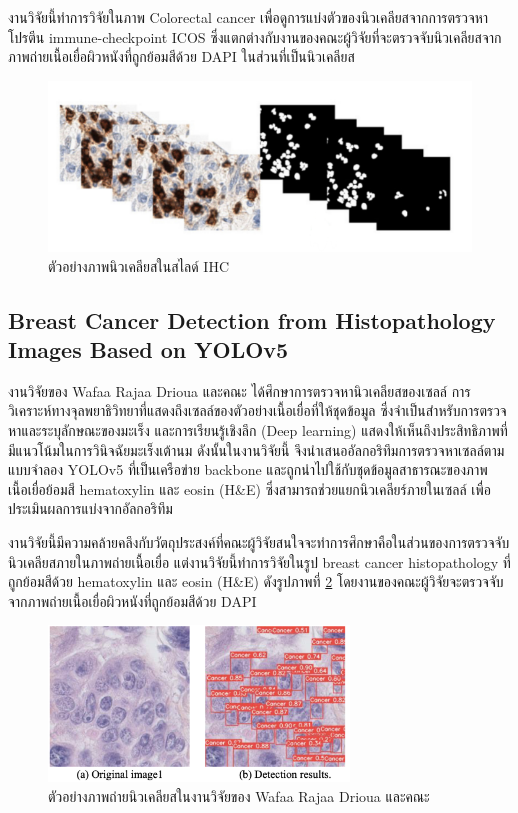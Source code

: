 \documentclass[12pt,oneside,openright,a4paper]{cpe-thai-project}
\begin{document}
 งานวิจัยนี้ทำการวิจัยในภาพ Colorectal cancer เพื่อดูการแบ่งตัวของนิวเคลียสจากการตรวจหาโปรตีน immune-checkpoint ICOS ซึ่งแตกต่างกับงานของคณะผู้วิจัยที่จะตรวจจับนิวเคลียสจากภาพถ่ายเนื้อเยื่อผิวหนังที่ถูกย้อมสีด้วย DAPI ในส่วนที่เป็นนิวเคลียส

 \begin{figure}[!h]
    \centering
    \includegraphics[scale=0.8]{images/paper-Amean.png}
    \caption[รูปตัวอย่างจากเปเปอร์ A means]{ตัวอย่างภาพนิวเคลียสในสไลด์ IHC}
    \label{fig:A means}
\end{figure}
\subsection{Breast Cancer Detection from Histopathology Images Based on YOLOv5}
งานวิจัยของ Wafaa Rajaa Drioua และคณะ \cite{yolopaper} ได้ศึกษาการตรวจหานิวเคลียสของเซลล์ การวิเคราะห์ทางจุลพยาธิวิทยาที่แสดงถึงเซลล์ของตัวอย่างเนื้อเยื่อที่ให้ชุดข้อมูล ซึ่งจําเป็นสําหรับการตรวจหาและระบุลักษณะของมะเร็ง และการเรียนรู้เชิงลึก (Deep learning) แสดงให้เห็นถึงประสิทธิภาพที่มีแนวโน้มในการวินิจฉัยมะเร็งเต้านม ดังนั้นในงานวิจัยนี้ จึงนําเสนออัลกอริทึมการตรวจหาเซลล์ตามแบบจําลอง YOLOv5 ที่เป็นเครือข่าย backbone และถูกนําไปใช้กับชุดข้อมูลสาธารณะของภาพเนื้อเยื่อย้อมสี hematoxylin และ eosin (H\&E) ซึ่งสามารถช่วยแยกนิวเคลียร์ภายในเซลล์  เพื่อประเมินผลการแบ่งจากอัลกอริทึม

 งานวิจัยนี้มีความคล้ายคลึงกับวัตถุประสงค์ที่คณะผู้วิจัยสนใจจะทำการศึกษาคือในส่วนของการตรวจจับนิวเคลียสภายในภาพถ่ายเนื้อเยื่อ แต่งานวิจัยนี้ทำการวิจัยในรูป breast cancer histopathology ที่ถูกย้อมสีด้วย hematoxylin และ eosin (H\&E) ดังรูปภาพที่ \ref{fig:breast} โดยงานของคณะผู้วิจัยจะตรวจจับจากภาพถ่ายเนื้อเยื่อผิวหนังที่ถูกย้อมสีด้วย DAPI

 \begin{figure}[!h]
    \centering
    \includegraphics[width=8cm]{images/yolo.png}
    \caption{ตัวอย่างภาพถ่ายนิวเคลียสในงานวิจัยของ Wafaa Rajaa Drioua และคณะ}
    \label{fig:breast}
\end{figure}
\end{document}
